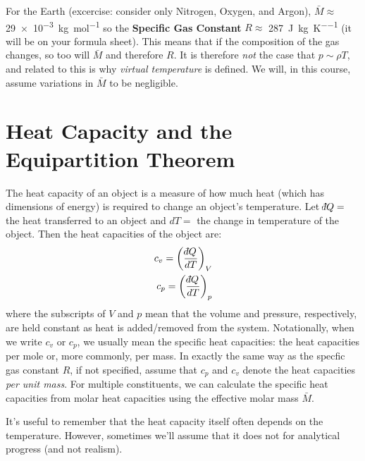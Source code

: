 For the Earth (excercise: consider only Nitrogen, Oxygen, and Argon), \(\bar{M}\approx\) \qty{29e-3}{\kilogram\per\mole} so the \textbf{Specific Gas Constant} \(R\approx\) \qty{287}{\joule\per\kilogram\per\kelvin} (it will be on your formula sheet). This means that if the composition of the gas changes, so too will \(\bar{M}\) and therefore \(R\). It is therefore \textit{not} the case that \(p\sim \rho T\), and related to this is why \textit{virtual temperature} is defined. We will, in this course, assume variations in \(\bar{M}\) to be negligible. 

\section{Heat Capacity and the Equipartition Theorem}\label{Equipartition}

The heat capacity of an object is a measure of how much heat (which has dimensions of energy) is required to change an object's temperature. Let   \(\dbar Q=\) the heat transferred to an object and \(dT=\) the change in temperature of the object. Then the heat capacities of the object are:
\begin{align}
    \label{eq cv}
    c_v=\left(\frac{\dbar Q}{dT}\right)_V\\
    \label{eq cp}
    c_p=\left(\frac{\dbar Q}{dT}\right)_p
\end{align}
where the subscripts of \(V\) and \(p\) mean that the volume and pressure, respectively, are held constant as heat is added/removed from the system. Notationally, when we write \(c_v\) or \(c_p\), we usually mean the specific heat capacities: the heat capacities per mole or, more commonly, per mass. In exactly the same way as the specfic gas constant \(R\), if not specified, assume that \(c_p\) and \(c_v\) denote the heat capacities \textit{per unit mass}. For multiple constituents, we can calculate the specific heat capacities from molar heat capacities using the effective molar mass \(\bar{M}\).

It's useful to remember that the heat capacity itself often depends on the temperature. However, sometimes we'll assume that it does not for analytical progress (and not realism).

